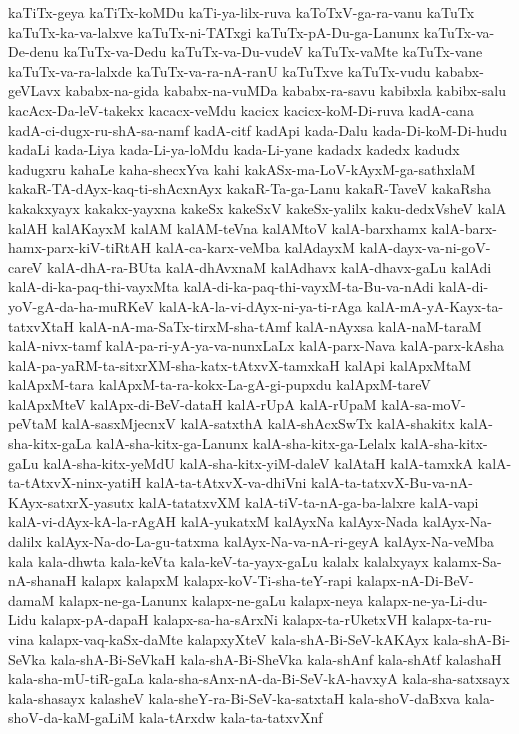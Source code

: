 {kaTiTx-geya
kaTiTx-koMDu
kaTi-ya-lilx-ruva
kaToTxV-ga-ra-vanu
kaTuTx
kaTuTx-ka-va-lalxve
kaTuTx-ni-TATxgi
kaTuTx-pA-Du-ga-Lanunx
kaTuTx-va-De-denu
kaTuTx-va-Dedu
kaTuTx-va-Du-vudeV
kaTuTx-vaMte
kaTuTx-vane
kaTuTx-va-ra-lalxde
kaTuTx-va-ra-nA-ranU
kaTuTxve
kaTuTx-vudu
kababx-geVLavx
kababx-na-gida
kababx-na-vuMDa
kababx-ra-savu
kabibxla
kabibx-salu
kacAcx-Da-leV-takekx
kacacx-veMdu
kacicx
kacicx-koM-Di-ruva
kadA-cana
kadA-ci-dugx-ru-shA-sa-namf
kadA-citf
kadApi
kada-Dalu
kada-Di-koM-Di-hudu
kadaLi
kada-Liya
kada-Li-ya-loMdu
kada-Li-yane
kadadx
kadedx
kadudx
kadugxru
kahaLe
kaha-shecxYva
kahi
kakASx-ma-LoV-kAyxM-ga-sathxlaM
kakaR-TA-dAyx-kaq-ti-shAcxnAyx
kakaR-Ta-ga-Lanu
kakaR-TaveV
kakaRsha
kakakxyayx
kakakx-yayxna
kakeSx
kakeSxV
kakeSx-yalilx
kaku-dedxVsheV
kalA
kalAH
kalAKayxM
kalAM
kalAM-teVna
kalAMtoV
kalA-barxhamx
kalA-barx-hamx-parx-kiV-tiRtAH
kalA-ca-karx-veMba
kalAdayxM
kalA-dayx-va-ni-goV-careV
kalA-dhA-ra-BUta
kalA-dhAvxnaM
kalAdhavx
kalA-dhavx-gaLu
kalAdi
kalA-di-ka-paq-thi-vayxMta
kalA-di-ka-paq-thi-vayxM-ta-Bu-va-nAdi
kalA-di-yoV-gA-da-ha-muRKeV
kalA-kA-la-vi-dAyx-ni-ya-ti-rAga
kalA-mA-yA-Kayx-ta-tatxvXtaH
kalA-nA-ma-SaTx-tirxM-sha-tAmf
kalA-nAyxsa
kalA-naM-taraM
kalA-nivx-tamf
kalA-pa-ri-yA-ya-va-nunxLaLx
kalA-parx-Nava
kalA-parx-kAsha
kalA-pa-yaRM-ta-sitxrXM-sha-katx-tAtxvX-tamxkaH
kalApi
kalApxMtaM
kalApxM-tara
kalApxM-ta-ra-kokx-La-gA-gi-pupxdu
kalApxM-tareV
kalApxMteV
kalApx-di-BeV-dataH
kalA-rUpA
kalA-rUpaM
kalA-sa-moV-peVtaM
kalA-sasxMjecnxV
kalA-satxthA
kalA-shAcxSwTx
kalA-shakitx
kalA-sha-kitx-gaLa
kalA-sha-kitx-ga-Lanunx
kalA-sha-kitx-ga-Lelalx
kalA-sha-kitx-gaLu
kalA-sha-kitx-yeMdU
kalA-sha-kitx-yiM-daleV
kalAtaH
kalA-tamxkA
kalA-ta-tAtxvX-ninx-yatiH
kalA-ta-tAtxvX-va-dhiVni
kalA-ta-tatxvX-Bu-va-nA-KAyx-satxrX-yasutx
kalA-tatatxvXM
kalA-tiV-ta-nA-ga-ba-lalxre
kalA-vapi
kalA-vi-dAyx-kA-la-rAgAH
kalA-yukatxM
kalAyxNa
kalAyx-Nada
kalAyx-Na-dalilx
kalAyx-Na-do-La-gu-tatxma
kalAyx-Na-va-nA-ri-geyA
kalAyx-Na-veMba
kala
kala-dhwta
kala-keVta
kala-keV-ta-yayx-gaLu
kalalx
kalalxyayx
kalamx-Sa-nA-shanaH
kalapx
kalapxM
kalapx-koV-Ti-sha-teY-rapi
kalapx-nA-Di-BeV-damaM
kalapx-ne-ga-Lanunx
kalapx-ne-gaLu
kalapx-neya
kalapx-ne-ya-Li-du-Lidu
kalapx-pA-dapaH
kalapx-sa-ha-sArxNi
kalapx-ta-rUketxVH
kalapx-ta-ru-vina
kalapx-vaq-kaSx-daMte
kalapxyXteV
kala-shA-Bi-SeV-kAKAyx
kala-shA-Bi-SeVka
kala-shA-Bi-SeVkaH
kala-shA-Bi-SheVka
kala-shAnf
kala-shAtf
kalashaH
kala-sha-mU-tiR-gaLa
kala-sha-sAnx-nA-da-Bi-SeV-kA-havxyA
kala-sha-satxsayx
kala-shasayx
kalasheV
kala-sheY-ra-Bi-SeV-ka-satxtaH
kala-shoV-daBxva
kala-shoV-da-kaM-gaLiM
kala-tArxdw
kala-ta-tatxvXnf
}
